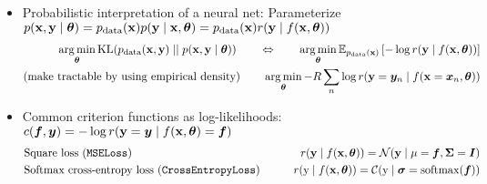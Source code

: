 \begin{itemize}
\item Probabilistic interpretation of a neural net: Parameterize $p({\mathbf{x}}, {\mathbf{y}} \mid {\bm{\theta}}) = p_{\text{data}}({\mathbf{x}}) p({\mathbf{y}} \mid {\mathbf{x}}, {\bm{\theta}}) = p_{\text{data}}({\mathbf{x}}) r({\mathbf{y}} \mid f({\mathbf{x}}, {\bm{\theta}}))$
  \begin{align*}
    \operatorname*{arg\,min}_{{\bm{\theta}}} \mathrm{KL}( p_{\text{data}}({\mathbf{x}}, {\mathbf{y}}) \mid\mid p({\mathbf{x}}, {\mathbf{y}} \mid {\bm{\theta}}) )
    \qquad\Leftrightarrow\qquad
    \operatorname*{arg\,min}_{{\bm{\theta}}} \mathbb{E}_{p_{\text{data}}({\mathbf{x}})} \left[
    - \log r({\mathbf{y}} \mid f({\mathbf{x}}, {\bm{\theta}}))
    \right]
    \\
    \text{(make tractable by using empirical density)}\qquad
    \operatorname*{arg\,min}_{{\bm{\theta}}} - R \sum_n \log r({\mathbf{y}}={\bm{y}}_n \mid f({\mathbf{x}}={\bm{x}}_n, {\bm{\theta}}))
  \end{align*}
\item Common criterion functions as log-likelihoods: $c({\bm{f}}, {\bm{y}}) = - \log r({\mathbf{y}}={\bm{y}} \mid f({\mathbf{x}}, {\bm{\theta}}) = {\bm{f}})$
  \begin{align*}
    &\text{Square loss (\texttt{MSELoss})}
      \qquad
    &r({\mathbf{y}} \mid f({\mathbf{x}}, {\bm{\theta}})) = {\mathcal{N}}( {\mathbf{y}} \mid \mu = {\bm{f}}, {\bm{\Sigma}} = {\bm{I}})
    \\
    &\text{Softmax cross-entropy loss (\texttt{CrossEntropyLoss})}
      \qquad
    &r({\textnormal{y}} \mid f({\mathbf{x}}, {\bm{\theta}})) = {\mathcal{C}}( {\textnormal{y}} \mid {\bm{\sigma}} = \mathrm{softmax}({\bm{f}}))
  \end{align*}


\end{itemize}
